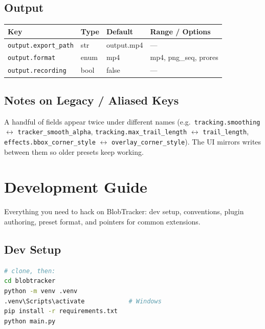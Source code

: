 \documentclass[11pt,a4paper,openany]{report}
\begin{document}
\section{Output}

\begin{tabularx}{\linewidth}{@{}lllX@{}}
    \toprule
    \textbf{Key} & \textbf{Type} & \textbf{Default} & \textbf{Range / Options} \\
    \midrule
    \texttt{output.export\_path} & str  & output.mp4 & --- \\
    \texttt{output.format}       & enum & mp4        & mp4, png\_seq, prores \\
    \texttt{output.recording}    & bool & false      & --- \\
    \bottomrule
\end{tabularx}

\section{Notes on Legacy / Aliased Keys}

A handful of fields appear twice under different names (e.g.\
\texttt{tracking.smoothing} $\leftrightarrow$
\texttt{tracker\_smooth\_alpha}, \texttt{tracking.max\_trail\_length}
$\leftrightarrow$ \texttt{trail\_length}, \texttt{effects.bbox\_corner\_style}
$\leftrightarrow$ \texttt{overlay\_corner\_style}). The UI mirrors writes
between them so older presets keep working.

\chapter{Development Guide}

Everything you need to hack on BlobTracker: dev setup, conventions, plugin
authoring, preset format, and pointers for common extensions.

\section{Dev Setup}

\begin{lstlisting}[language=bash]
# clone, then:
cd blobtracker
python -m venv .venv
.venv\Scripts\activate            # Windows
pip install -r requirements.txt
python main.py
\end{lstlisting}
\end{document}
